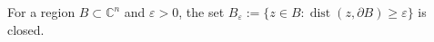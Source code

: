 For a region $B \subset \mathbb{C}^n$ and $\varepsilon > 0$, the set $B_\varepsilon := \{ z \in B : \operatorname{dist}(z, \partial B) \geqslant \varepsilon \}$ is closed.
